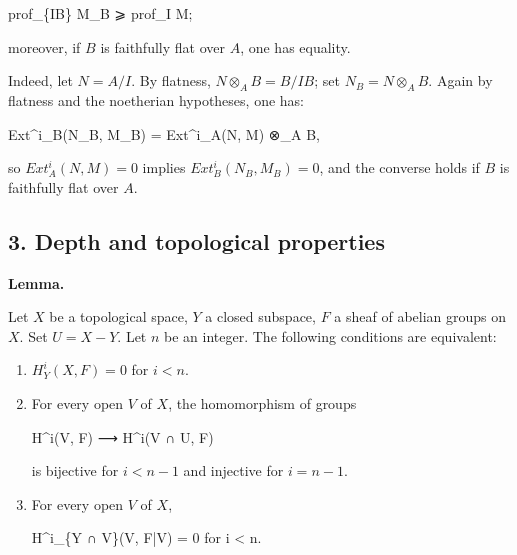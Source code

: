 \documentclass[
]{article}
\newenvironment{Shaded}{}{}
\newcommand{\NormalTok}[1]{#1}
\begin{document}
\begin{Shaded}
\begin{Highlighting}[]
\NormalTok{prof\_\{IB\} M\_B ⩾ prof\_I M;}
\end{Highlighting}
\end{Shaded}

moreover, if \(B\) is faithfully flat over \(A\), one has equality.

Indeed, let \(N = A/I\). By flatness, \(N \otimes_{A} B = B/IB\); set
\(N_{B} = N \otimes_{A} B\). Again by flatness and the noetherian
hypotheses, one has:

\begin{Shaded}
\begin{Highlighting}[]
\NormalTok{Ext\^{}i\_B(N\_B, M\_B) = Ext\^{}i\_A(N, M) ⊗\_A B,}
\end{Highlighting}
\end{Shaded}

so \(Ext^{i}_{A}(N, M) = 0\) implies \(Ext^{i}_{B}(N_{B}, M_{B}) = 0\),
and the converse holds if \(B\) is faithfully flat over \(A\).

\subsection{3. Depth and topological
properties}\label{depth-and-topological-properties}

\textbf{Lemma.}

Let \(X\) be a topological space, \(Y\) a closed subspace, \(F\) a sheaf
of abelian groups on \(X\). Set \(U = X - Y\). Let \(n\) be an integer.
The following conditions are equivalent:

\begin{enumerate}
\def\labelenumi{\arabic{enumi}.}
\item
  \(H^{i}_{Y}(X, F) = 0\) for \(i < n\).
\item
  For every open \(V\) of \(X\), the homomorphism of groups

\begin{Shaded}
\begin{Highlighting}[]
\NormalTok{H\^{}i(V, F) ⟶ H\^{}i(V ∩ U, F)}
\end{Highlighting}
\end{Shaded}

  is bijective for \(i < n - 1\) and injective for \(i = n - 1\).
\item
  For every open \(V\) of \(X\),

\begin{Shaded}
\begin{Highlighting}[]
\NormalTok{H\^{}i\_\{Y ∩ V\}(V, F|V) = 0 for i \textless{} n.}
\end{Highlighting}
\end{Shaded}
\end{enumerate}
\end{document}
